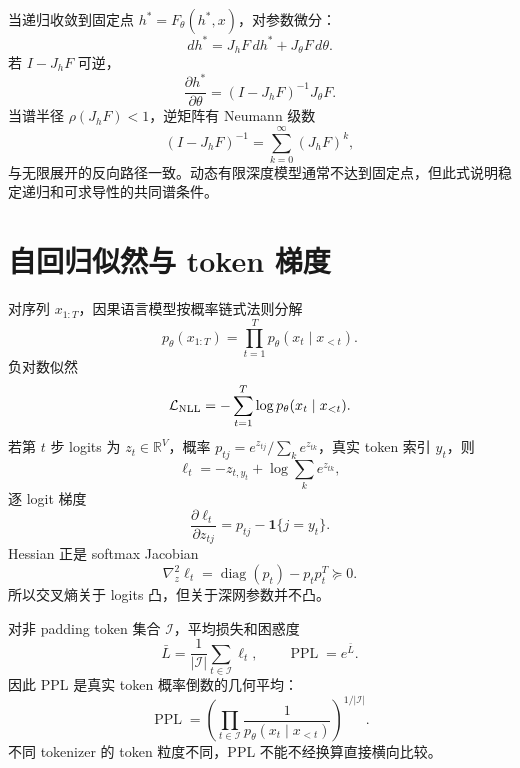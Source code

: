 \documentclass[11pt]{article}
\numberwithin{equation}{section}
\newcommand{\R}{\mathbb{R}}
\newcommand{\1}{\mathbf{1}}
\newcommand{\cL}{\mathcal{L}}
\newcommand{\diag}{\operatorname{diag}}
\begin{document}
当递归收敛到固定点 $h^*=F_\theta(h^*,x)$，对参数微分：
\begin{equation}
 dh^*=J_hF\,dh^*+J_\theta F\,d\theta.
\end{equation}
若 $I-J_hF$ 可逆，
\begin{equation}
 \frac{\partial h^*}{\partial\theta}
 =(I-J_hF)^{-1}J_\theta F.
\end{equation}
当谱半径 $\rho(J_hF)<1$，逆矩阵有 Neumann 级数
\begin{equation}
 (I-J_hF)^{-1}=\sum_{k=0}^{\infty}(J_hF)^k,
\end{equation}
与无限展开的反向路径一致。动态有限深度模型通常不达到固定点，但此式说明稳定递归和可求导性的共同谱条件。

\section{自回归似然与 token 梯度}

对序列 $x_{1:T}$，因果语言模型按概率链式法则分解
\begin{equation}
 p_\theta(x_{1:T})=\prod_{t=1}^{T}p_\theta(x_t\mid x_{<t}).
\end{equation}
负对数似然
\begin{equation}
 \cL_{\rm NLL}=-\sum_{t=1}^{T}\log p_\theta(x_t\mid x_{<t}).
\end{equation}
若第 $t$ 步 logits 为 $z_t\in\R^{V}$，概率
$p_{tj}=e^{z_{tj}}/\sum_ke^{z_{tk}}$，真实 token 索引 $y_t$，则
\begin{equation}
 \ell_t=-z_{t,y_t}+\log\sum_ke^{z_{tk}},
\end{equation}
逐 logit 梯度
\begin{equation}
 \frac{\partial\ell_t}{\partial z_{tj}}
 =p_{tj}-\1\{j=y_t\}.
\end{equation}
Hessian 正是 softmax Jacobian
\begin{equation}
 \nabla_z^2\ell_t=\diag(p_t)-p_tp_t^T\succeq0.
\end{equation}
所以交叉熵关于 logits 凸，但关于深网参数并不凸。

对非 padding token 集合 $\mathcal I$，平均损失和困惑度
\begin{equation}
 \bar L=\frac1{|\mathcal I|}\sum_{t\in\mathcal I}\ell_t,
 \qquad \operatorname{PPL}=e^{\bar L}.
\end{equation}
因此 PPL 是真实 token 概率倒数的几何平均：
\begin{equation}
 \operatorname{PPL}=\left(
 \prod_{t\in\mathcal I}\frac1{p_\theta(x_t\mid x_{<t})}
 \right)^{1/|\mathcal I|}.
\end{equation}
不同 tokenizer 的 token 粒度不同，PPL 不能不经换算直接横向比较。
\end{document}
